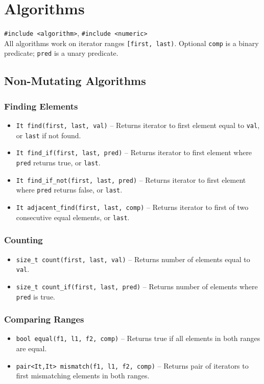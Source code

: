 \section{Algorithms}
\texttt{\#include <algorithm>}, \texttt{\#include <numeric>}\\
All algorithms work on iterator ranges \texttt{[first, last)}. Optional \texttt{comp} is a binary predicate; \texttt{pred} is a unary predicate.

\subsection{Non-Mutating Algorithms}

\subsubsection{Finding Elements}
\begin{itemize}
\item \texttt{It find(first, last, val)} -- Returns iterator to first element equal to \texttt{val}, or \texttt{last} if not found.
\item \texttt{It find\_if(first, last, pred)} -- Returns iterator to first element where \texttt{pred} returns true, or \texttt{last}.
\item \texttt{It find\_if\_not(first, last, pred)} -- Returns iterator to first element where \texttt{pred} returns false, or \texttt{last}.
\item \texttt{It adjacent\_find(first, last, comp)} -- Returns iterator to first of two consecutive equal elements, or \texttt{last}.
\end{itemize}

\subsubsection{Counting}
\begin{itemize}
\item \texttt{size\_t count(first, last, val)} -- Returns number of elements equal to \texttt{val}.
\item \texttt{size\_t count\_if(first, last, pred)} -- Returns number of elements where \texttt{pred} is true.
\end{itemize}

\subsubsection{Comparing Ranges}
\begin{itemize}
\item \texttt{bool equal(f1, l1, f2, comp)} -- Returns true if all elements in both ranges are equal.
\item \texttt{pair<It,It> mismatch(f1, l1, f2, comp)} -- Returns pair of iterators to first mismatching elements in both ranges.
\end{itemize}

